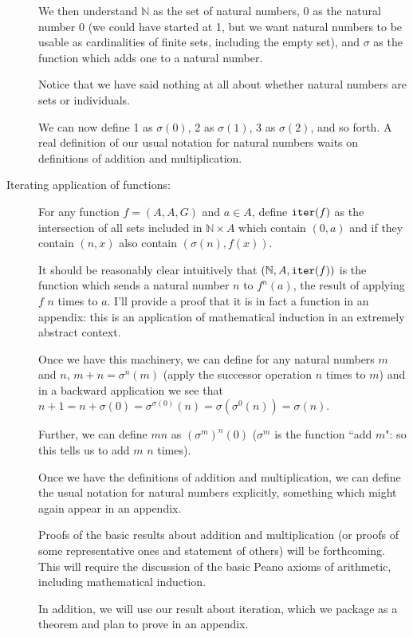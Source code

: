 \documentclass[12pt]{article}
\begin{document}
\begin{description}
We then understand $\mathbb N$ as the set of natural numbers, 0 as the natural number 0 (we could have started at 1, but we want natural numbers to be usable as cardinalities of finite sets, including the empty set), and $\sigma$ as the function which adds one to a natural number.

Notice that we have said nothing at all about whether natural numbers are sets or individuals.

We can now define 1 as $\sigma(0)$, 2 as $\sigma(1)$, 3 as $\sigma(2)$, and so forth.  A real definition of our usual notation for natural numbers waits on definitions of addition and multiplication.

\item[Iterating application of functions:]

For any function $f = (A,A,G)$ and $a \in A$, define ${\tt iter}(f)$ as the intersection of all sets included in $\mathbb N \times A$ which contain
$(0,a)$ and if they contain $(n,x)$ also contain $(\sigma(n),f(x))$.

It should be reasonably clear intuitively that $(\mathbb N,A,{\tt iter}(f))$ is the function which sends a natural number $n$ to $f^n(a)$, the result of applying $f$ $n$ times to $a$.  I'll provide a proof that it is in fact a function in an appendix:  this is an application of mathematical induction in an extremely abstract context.

Once we have this machinery, we can define for any natural numbers $m$ and $n$, $m+n = \sigma^n(m)$ (apply the successor operation $n$ times to $m$) and in a backward application we see that $n+1 = n+\sigma(0) = \sigma^{\sigma(0)}(n) = \sigma(\sigma^0(n)) = \sigma(n)$.

Further, we can define $mn$ as $(\sigma^m)^n(0)$ ($\sigma^m$ is the function ``add $m$":  so this tells us to add $m$ $n$ times).

Once we have the definitions of addition and multiplication, we can define the usual notation for natural numbers explicitly, something which might again appear in an appendix.

Proofs of the basic results about addition and multiplication (or proofs of some representative ones and statement of others) will be forthcoming.  This will require the discussion of the basic Peano axioms of arithmetic, including mathematical induction.

In addition, we will use our result about iteration, which we package as a theorem and plan to prove in an appendix.


\end{description}
\end{document}
